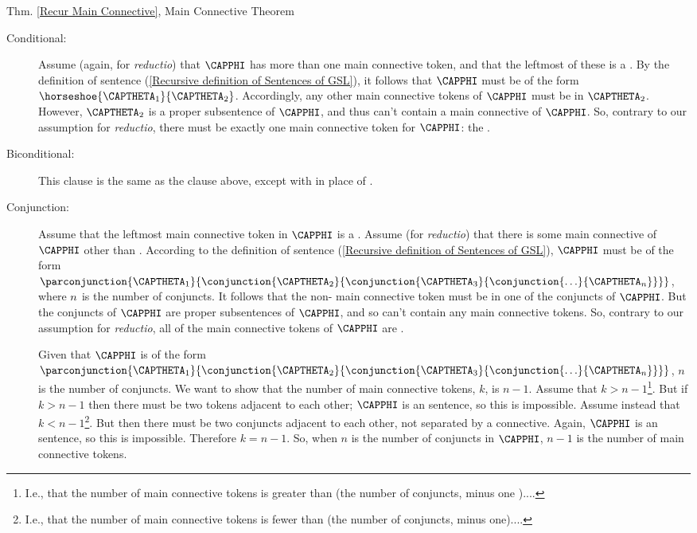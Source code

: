 \begin{PROOFOF}{Thm. \ref{Recur Main Connective}, Main Connective Theorem}
\begin{description}
\begin{description}
\item[Conditional:]
Assume (again, for \emph{reductio}) that $\CAPPHI$ has more than one main connective token, and that the leftmost of these is a \mention{$\HORSESHOE$}.  By the definition of \GSL{} sentence (\ref{Recursive definition of Sentences of GSL}), it follows that $\CAPPHI$ must be of the form $\horseshoe{\CAPTHETA_1}{\CAPTHETA_2}$.  Accordingly, any other main connective tokens of $\CAPPHI$ must be in $\CAPTHETA_2$.  However, $\CAPTHETA_2$ is a proper subsentence of $\CAPPHI$, and thus can't contain a main connective of $\CAPPHI$.  So, contrary to our assumption for \emph{reductio}, there must be exactly one main connective token for $\CAPPHI$: the \mention{$\HORSESHOE$}.

\item[Biconditional:]
This clause is the same as the  clause above, except with \mention{$\TRIPLEBAR$} in place of \mention{$\HORSESHOE$}.

\item[Conjunction:]
Assume that the leftmost main connective token in $\CAPPHI$ is a \mention{$\WEDGE$}.  Assume (for \emph{reductio}) that there is some main connective of $\CAPPHI$ other than \mention{$\WEDGE$}.  According to the definition of \GSL{} sentence (\ref{Recursive definition of Sentences of GSL}), $\CAPPHI$ must be of the form $\parconjunction{\CAPTHETA_1}{\conjunction{\CAPTHETA_2}{\conjunction{\CAPTHETA_3}{\conjunction{\ldots}{\CAPTHETA_{\integer{n}}}}}}$, where $n$ is the number of conjuncts.  It follows that the non-\mention{$\WEDGE$} main connective token must be in one of the conjuncts of $\CAPPHI$.  But the conjuncts of $\CAPPHI$ are proper subsentences of $\CAPPHI$, and so can't contain any main connective tokens.  So, contrary to our assumption for \emph{reductio}, all of the main connective tokens of $\CAPPHI$ are \mention{$\WEDGE$}.

Given that $\CAPPHI$ is of the form $\parconjunction{\CAPTHETA_1}{\conjunction{\CAPTHETA_2}{\conjunction{\CAPTHETA_3}{\conjunction{\ldots}{\CAPTHETA_{\integer{n}}}}}}$, $n$ is the number of conjuncts.  We want to show that the number of main connective tokens, $k$, is $n-1$.  Assume that $k>n-1$\footnote{I.e., that the number of main connective tokens is greater than (the number of conjuncts, minus one )....}.  But if $k>n-1$ then there must be two \mention{$\WEDGE$} tokens adjacent to each other; $\CAPPHI$ is an \GSL{} sentence, so this is impossible.  Assume instead that $k<n-1$\footnote{I.e., that the number of main connective tokens is fewer than (the number of conjuncts, minus one)....}.  But then there must be two conjuncts adjacent to each other, not separated by a connective.  Again, $\CAPPHI$ is an \GSL{} sentence, so this is impossible.  Therefore $k=n-1$.  So, when $n$ is the number of conjuncts in $\CAPPHI$, $n-1$ is the number of main connective tokens.


\end{description}
\end{description}
\end{PROOFOF}
